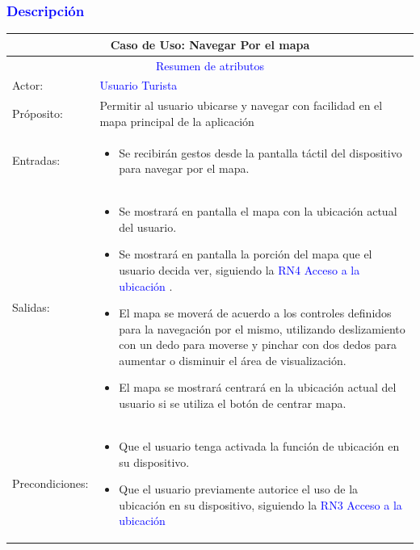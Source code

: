 \subsubsection{\textcolor{blue}{Descripción}}
\begin{tabularx}{16cm}{||l|X||}
	\hline
	\multicolumn{2}{||c||}{Caso de Uso: Navegar Por el mapa }  \\
	\hline
	\multicolumn{2}{||c||}{\textcolor{blue}{Resumen de atributos}} \\
	\hline
	{Actor:} & {\textcolor{blue}{Usuario Turista}} \\
	\hline
	{Próposito:} & {Permitir al usuario ubicarse y navegar con facilidad en el mapa principal de la aplicación} \\
	\hline
	{Entradas:} & {\begin{itemize}
            \item  Se recibirán gestos desde la pantalla táctil del dispositivo para navegar por el mapa.
        \end{itemize}}\\
	\hline
	{Salidas:} & {\begin{itemize}
            \item Se mostrará en pantalla el mapa con la ubicación actual del usuario.
            \item  Se mostrará en pantalla la porción del mapa que el usuario decida ver, siguiendo la {\textcolor{blue}{RN4 Acceso a la ubicación}} .
            \item El mapa se moverá de acuerdo a los controles definidos para la navegación por el mismo, utilizando deslizamiento con un dedo para moverse y pinchar con dos dedos para aumentar o disminuir el área de visualización.
            \item El mapa se mostrará centrará en la ubicación actual del usuario si se utiliza el botón de centrar mapa.
        \end{itemize}}\\
	\hline
	{Precondiciones:} & { \begin{itemize}
            \item  Que el usuario tenga activada la función de ubicación en su dispositivo.
            \item Que el usuario previamente autorice el uso de la ubicación en su dispositivo, siguiendo la {\textcolor{blue}{RN3 Acceso a la ubicación}} 
       

\end{itemize}}
\end{tabularx}
